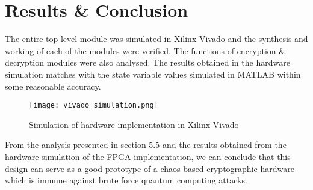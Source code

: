 \chapter{Results \& Conclusion}
\label{chap:conclusion}
\setlength{\parskip}{1.5mm}

The entire top level module was simulated in Xilinx Vivado and the synthesis and working of each of the modules were verified. The functions of encryption \& decryption modules were also analysed. The results obtained in the hardware simulation matches with the state variable values simulated in MATLAB within some reasonable accuracy.

\begin{figure}[H]
\centering
\texttt{[image: vivado\_simulation.png]}
\caption{Simulation of hardware implementation  in Xilinx Vivado}\label{fig:vivado_simulation}
\end{figure}

From the analysis presented in section 5.5 and the results obtained from the hardware simulation of the FPGA implementation, we can conclude that this design can serve as a good prototype of a chaos based cryptographic hardware which is immune against brute force quantum computing attacks.

